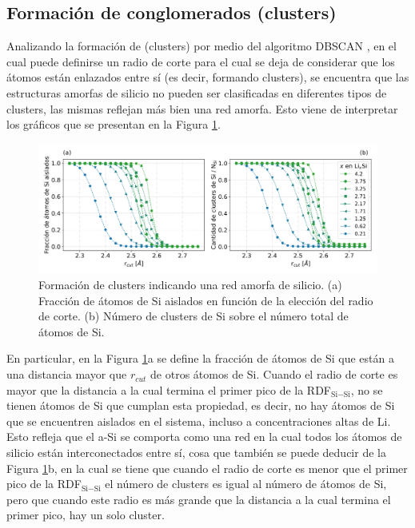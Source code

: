 \subsection{Formación de conglomerados (clusters)}\label{s:clusters}

Analizando la formación de  (clusters) por medio del algoritmo DBSCAN 
\cite{ester1996}, en el cual puede definirse un radio de corte para el cual se 
deja de considerar que los átomos están enlazados entre sí (es decir, formando 
clusters), se encuentra que las estructuras amorfas de silicio no pueden ser 
clasificadas en diferentes tipos de clusters, las mismas reflejan más bien 
una red amorfa. Esto viene de interpretar los gráficos que se presentan en la 
Figura \ref{fig:clusters}. 
\begin{figure}[h!]
    \centering
    \includegraphics[width=\textwidth]{Silicio/caracterizacion/resultados/clusters/clusters.png}
    \caption{Formación de clusters indicando una red amorfa de silicio. (a) 
    Fracción de átomos de Si aislados en función de la elección del
    radio de corte. (b) Número de clusters de Si sobre el número total de átomos 
    de Si.}
    \label{fig:clusters}
\end{figure}

En particular, en la Figura \ref{fig:clusters}a se define la fracción 
de átomos de Si que están a una distancia mayor que $r_{cut}$ de otros átomos de 
Si. Cuando el radio de corte es mayor que la distancia a la cual termina el 
primer pico de la RDF$_{\text{Si}-\text{Si}}$, no se tienen átomos de Si que cumplan esta 
propiedad, es decir, no hay átomos de Si que se encuentren aislados en el sistema,
incluso a concentraciones altas de Li. Esto refleja que el a-Si se comporta como 
una red en la cual todos los átomos de silicio están interconectados entre sí, 
cosa que también se puede deducir de la Figura \ref{fig:clusters}b, en la cual 
se tiene que cuando el radio de corte es menor que el primer pico de la RDF$_{\text{Si}-\text{Si}}$ 
el número de clusters es igual al número de átomos de Si, pero que cuando este 
radio es más grande que la distancia a la cual termina el primer pico, hay un 
solo cluster.
